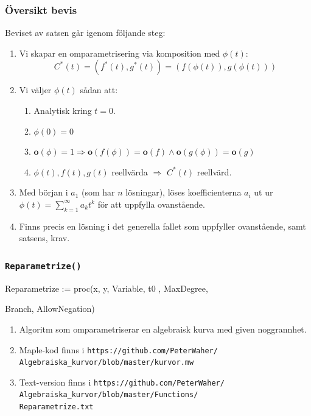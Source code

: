 \documentclass{beamer}
\begin{document}
\begin{frame}
	\frametitle{Översikt bevis}
	Beviset av satsen går igenom följande steg:
	
	\begin{enumerate}
		\item<1-> Vi skapar en omparametrisering via komposition med $\phi(t)$:
		\[C^*(t) = (f^*(t), g^*(t)) = (f(\phi(t)), g(\phi(t)))\]
		
		\item<2-> Vi väljer $\phi(t)$ sådan att:
		\begin{enumerate}
			\item<3-> Analytisk kring $t = 0$.
			
			\item<4-> $\phi(0)=0$
			
			\item<5-> $\mathbf{o}(\phi)=1 \Longrightarrow \mathbf{o}(f(\phi))=\mathbf{o}(f) \wedge \mathbf{o}(g(\phi))=\mathbf{o}(g)$
			
			\item<6-> $\phi(t), f(t), g(t)$ reellvärda $\Longrightarrow$ $C^*(t)$ reellvärd.
			
		\end{enumerate}
		
		\item<7-> Med början i $a_1$ (som har $n$ lösningar), löses koefficienterna $a_i$ ut ur $\phi(t)=\sum_{k=1}^{\infty}a_k t^k$ för att uppfylla ovanstående.
		
		\item<8-> Finns precis en lösning i det generella fallet som uppfyller ovanstående, samt satsens, krav.
		
	\end{enumerate}
\end{frame}

\begin{frame}
	\frametitle{\texttt{Reparametrize()}}

\begin{semiverbatim}
Reparametrize := proc(x, y, Variable, t0 , MaxDegree,

\qquad Branch, AllowNegation)
\end{semiverbatim}
	
	\begin{enumerate}
		\item<1-> Algoritm som omparametriserar en algebraisk kurva med given noggrannhet.
		
		\item<2-> Maple-kod finns i \texttt{https://github.com/PeterWaher/\\
			\qquad Algebraiska\_kurvor/blob/master/kurvor.mw}
		
		\item<3-> Text-version finns i
		\texttt{https://github.com/PeterWaher/\\
			\qquad Algebraiska\_kurvor/blob/master/Functions/\\
			\qquad Reparametrize.txt} 
	\end{enumerate}
\end{frame}
\end{document}
